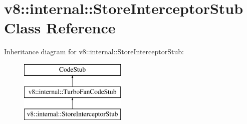 \hypertarget{classv8_1_1internal_1_1_store_interceptor_stub}{}\section{v8\+:\+:internal\+:\+:Store\+Interceptor\+Stub Class Reference}
\label{classv8_1_1internal_1_1_store_interceptor_stub}
Inheritance diagram for v8\+:\+:internal\+:\+:Store\+Interceptor\+Stub\+:\begin{figure}[H]
\begin{center}
\leavevmode
\includegraphics[height=3.000000cm]{classv8_1_1internal_1_1_store_interceptor_stub}
\end{center}
\end{figure}
